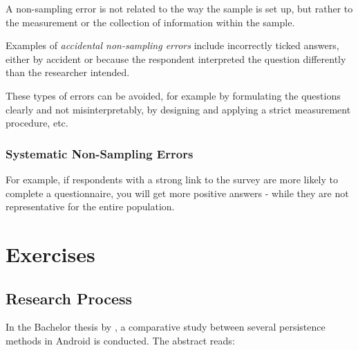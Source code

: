 A non-sampling error is not related to the way the sample is set up, but rather to the measurement or the collection of information within the sample.

Examples of \emph{accidental non-sampling errors} include incorrectly ticked answers, either by accident or because the respondent interpreted the question differently than the researcher intended.

These types of errors can be avoided, for example by formulating the questions clearly and not misinterpretably, by designing and applying a strict measurement procedure, etc.

\subsubsection{Systematic Non-Sampling Errors}

For example, if respondents with a strong link to the survey are more likely to complete a questionnaire, you will get more positive answers - while they are not representative for the entire population.

\section{Exercises}
\label{sec:onderzoeksproces-oefeningen}

\subsection{Research Process}

In the Bachelor thesis by \textcite{Akin2016}, a comparative study between several persistence methods in Android is conducted. The abstract reads:

